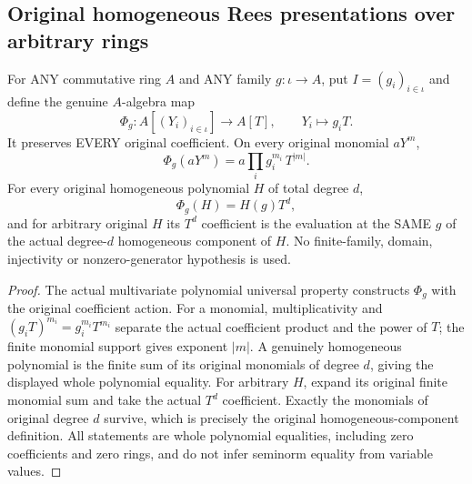 \subsection{Original homogeneous Rees presentations over arbitrary rings}

\begin{definition}
\label{algebra:actual-rees-presentation}
\leanok
For ANY commutative ring $A$ and ANY family $g:\iota\to A$, put
$I=(g_i)_{i\in\iota}$ and define the genuine $A$-algebra map
\[
 \Phi_g:A[(Y_i)_{i\in\iota}]\longrightarrow A[T],\qquad Y_i\longmapsto g_iT.
\]
It preserves EVERY original coefficient. On every original monomial $aY^m$,
\[
 \Phi_g(aY^m)=a\prod_i g_i^{m_i}\,T^{|m|}.
\]
For every original homogeneous polynomial $H$ of total degree $d$,
\[
 \Phi_g(H)=H(g)T^d,
\]
and for arbitrary original $H$ its $T^d$ coefficient is the evaluation
at the SAME $g$ of the actual degree-$d$ homogeneous component of $H$.
No finite-family, domain, injectivity or nonzero-generator hypothesis is used.
\end{definition}
\begin{proof}
The actual multivariate polynomial universal property constructs $\Phi_g$
with the original coefficient action. For a monomial, multiplicativity
and $(g_iT)^{m_i}=g_i^{m_i}T^{m_i}$ separate the actual coefficient product
and the power of $T$; the finite monomial support gives exponent $|m|$.
A genuinely homogeneous polynomial is the finite sum of its original
monomials of degree $d$, giving the displayed whole polynomial equality.
For arbitrary $H$, expand its original finite monomial sum and take the
actual $T^d$ coefficient. Exactly the monomials of original degree $d$
survive, which is precisely the original homogeneous-component definition.
All statements are whole polynomial equalities, including zero coefficients
and zero rings, and do not infer seminorm equality from variable values.
\end{proof}

